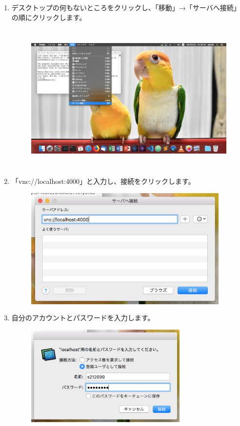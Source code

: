 \documentclass{jarticle}
\begin{document}
\begin{enumerate}
  \newpage
  \item デスクトップの何もないところをクリックし、「移動」→「サーバへ接続」の順にクリックします。
  \begin{figure}[H]
    \centering
    \includegraphics[height=7.5cm,pagebox=cropbox,clip]{fig/VNCMac2.png}
  \end{figure}
  \item 「vnc://localhost:4000」と入力し、接続をクリックします。
  \begin{figure}[H]
    \centering
    \includegraphics[height=6cm,pagebox=cropbox,clip]{fig/VNCMac3.png}
  \end{figure}
  \item 自分のアカウントとパスワードを入力します。
  \begin{figure}[H]
    \centering
    \includegraphics[height=5cm,pagebox=cropbox,clip]{fig/VNCMac4.png}

\end{figure}
\end{enumerate}
\end{document}
